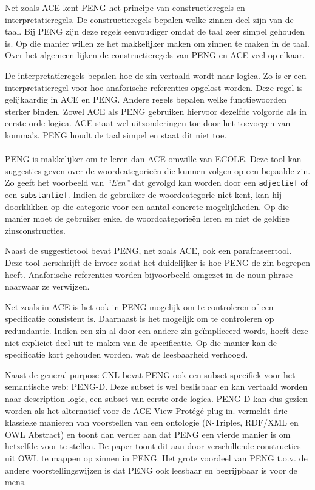 \documentclass[]{article}
\theoremstyle{definition}
\newcommand{\example}[1]{\textit{``#1''}}
\begin{document}
Net zoals ACE kent PENG het principe van constructieregels en interpretatieregels. De constructieregels bepalen welke zinnen deel zijn van de taal. Bij PENG zijn deze regels eenvoudiger omdat de taal zeer simpel gehouden is. Op die manier willen ze het makkelijker maken om zinnen te maken in de taal. Over het algemeen lijken de constructieregels van PENG en ACE veel op elkaar.

De interpretatieregels bepalen hoe de zin vertaald wordt naar logica. Zo is er een interpretatieregel voor hoe anaforische referenties opgelost worden. Deze regel is gelijkaardig in ACE en PENG. Andere regels bepalen welke functiewoorden sterker binden. Zowel ACE als PENG gebruiken hiervoor dezelfde volgorde als in eerste-orde-logica. ACE staat wel uitzonderingen toe door het toevoegen van komma's. PENG houdt de taal simpel en staat dit niet toe.

\paragraph{} PENG is makkelijker om te leren dan ACE omwille van ECOLE\cite{Schwitter2003}. Deze tool kan suggesties geven over de woordcategorieën die kunnen volgen op een bepaalde zin. Zo geeft \cite{Schwitter2003} het voorbeeld van \example{Een} dat gevolgd kan worden door een \texttt{adjectief} of een \texttt{substantief}. Indien de gebruiker de woordcategorie niet kent, kan hij doorklikken op die categorie voor een aantal concrete mogelijkheden. Op die manier moet de gebruiker enkel de woordcategorieën leren en niet de geldige zinsconstructies.

Naast de suggestietool bevat PENG, net zoals ACE, ook een parafraseertool. Deze tool herschrijft de invoer zodat het duidelijker is hoe PENG de zin begrepen heeft. Anaforische referenties worden bijvoorbeeld omgezet in de noun phrase naarwaar ze verwijzen.

Net zoals in ACE is het ook in PENG mogelijk om te controleren of een specificatie consistent is\cite{Schwitter2004b}. Daarnaast is het mogelijk om te controleren op redundantie. Indien een zin al door een andere zin geïmpliceerd wordt, hoeft deze niet expliciet deel uit te maken van de specificatie. Op die manier kan de specificatie kort gehouden worden, wat de leesbaarheid verhoogd.

Naast de general purpose CNL bevat PENG ook een subset specifiek voor het semantische web: PENG-D\cite{Schwitter2004}. Deze subset is wel beslisbaar en kan vertaald worden naar description logic, een subset van eerste-orde-logica. PENG-D kan dus gezien worden als het alternatief voor de ACE View Protégé plug-in.
\cite{Schwitter2006} vermeldt drie klassieke manieren van voorstellen van een ontologie (N-Triples, RDF/XML en OWL Abstract) en toont dan verder aan dat PENG een vierde manier is om hetzelfde voor te stellen. De paper toont dit aan door verschillende constructies uit OWL te mappen op zinnen in PENG. Het grote voordeel van PENG t.o.v. de andere voorstellingswijzen is dat PENG ook leesbaar en begrijpbaar is voor de mens.
\end{document}
